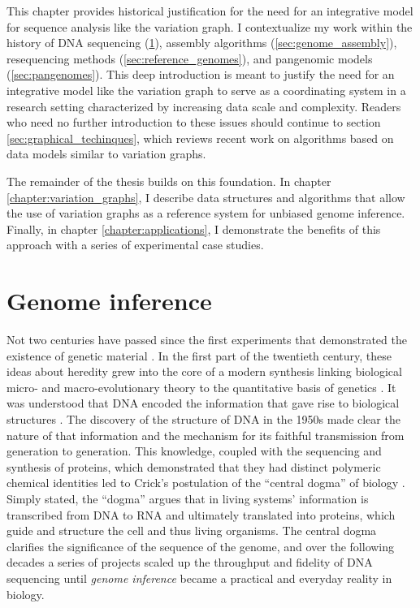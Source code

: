This chapter provides historical justification for the need for an integrative model for sequence analysis like the variation graph.
I contextualize my work within the history of DNA sequencing (\ref{sec:genome_inference}), assembly algorithms (\ref{sec:genome_assembly}), resequencing methods (\ref{sec:reference_genomes}), and pangenomic models (\ref{sec:pangenomes}).
This deep introduction is meant to justify the need for an integrative model like the variation graph to serve as a coordinating system in a research setting characterized by increasing data scale and complexity.
Readers who need no further introduction to these issues should continue to section \ref{sec:graphical_techinques}, which reviews recent work on algorithms based on data models similar to variation graphs.

The remainder of the thesis builds on this foundation.
In chapter \ref{chapter:variation_graphs}, I describe data structures and algorithms that allow the use of variation graphs as a reference system for unbiased genome inference.
Finally, in chapter \ref{chapter:applications}, I demonstrate the benefits of this approach with a series of experimental case studies.

\section{Genome inference}
\label{sec:genome_inference}

Not two centuries have passed since the first experiments that demonstrated the existence of genetic material \cite{mendel1866versuche}.
In the first part of the twentieth century, these ideas about heredity grew into the core of a modern synthesis linking biological micro- and macro-evolutionary theory to the quantitative basis of genetics \cite{huxley1942evolution}.
It was understood that DNA encoded the information that gave rise to biological structures \cite{avery1944studies}.
The discovery of the structure of DNA in the 1950s \cite{watson1953molecular} made clear the nature of that information and the mechanism for its faithful transmission from generation to generation.
This knowledge, coupled with the sequencing and synthesis of proteins, which demonstrated that they had distinct polymeric chemical identities \cite{sanger1951amino} led to Crick's postulation of the ``central dogma'' of biology \cite{crick1958protein,crick1970central}.
Simply stated, the ``dogma'' argues that in living systems' information is transcribed from DNA to RNA and ultimately translated into proteins, which guide and structure the cell and thus living organisms.
The central dogma clarifies the significance of the sequence of the genome, and over the following decades a series of projects scaled up the throughput and fidelity of DNA sequencing until \emph{genome inference} became a practical and everyday reality in biology.

